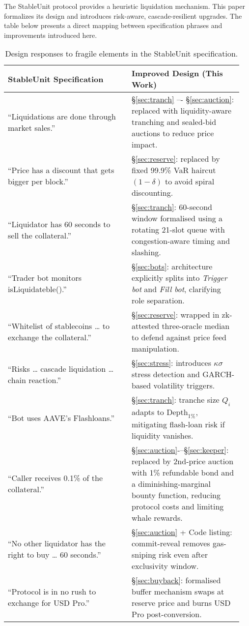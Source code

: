 \documentclass[11pt]{article}
\newcommand{\secref}[1]{\hyperref[#1]{\S\ref*{#1}}}
\begin{document}
The StableUnit protocol \parencite{stableunit2025spec} provides a heuristic liquidation mechanism. This paper formalizes its design and introduces risk-aware, cascade-resilient upgrades. The table below presents a direct mapping between specification phrases and improvements introduced here.
\begin{table}[ht]
\centering
\caption{Design responses to fragile elements in the StableUnit specification.}
\label{tab:trigger-map}

\begin{tabular}{@{}p{0.5\linewidth} p{0.45\linewidth}@{}}
\toprule
\textbf{StableUnit Specification} & \textbf{Improved Design (This Work)} \\
\midrule
“Liquidations are done through market sales.” & \secref{sec:tranch} –- \secref{sec:auction}: replaced with liquidity-aware tranching and sealed-bid auctions to reduce price impact. \\
“Price has a discount that gets bigger per block.” & \secref{sec:reserve}: replaced by fixed 99.9\% VaR haircut $(1 - \delta)$ to avoid spiral discounting. \\
“Liquidator has 60 seconds to sell the collateral.” & \secref{sec:tranch}: 60-second window formalised using a rotating 21-slot queue with congestion-aware timing and slashing. \\
“Trader bot monitors isLiquidateble().” & \secref{sec:bots}: architecture explicitly splits into \textit{Trigger bot} and \textit{Fill bot}, clarifying role separation. \\
“Whitelist of stablecoins … to exchange the collateral.” & \secref{sec:reserve}: wrapped in zk-attested three-oracle median to defend against price feed manipulation. \\
“Risks … cascade liquidation … chain reaction.” & \secref{sec:stress}: introduces $\kappa\sigma$ stress detection and GARCH-based volatility triggers. \\
“Bot uses AAVE’s Flashloans.” & \secref{sec:tranch}: tranche size $Q_i$ adapts to $\text{Depth}_{1\%}$, mitigating flash-loan risk if liquidity vanishes. \\
“Caller receives 0.1\% of the collateral.” & \secref{sec:auction}-–\secref{sec:keeper}: replaced by 2nd-price auction with 1\% refundable bond and a diminishing-marginal bounty function, reducing protocol costs and limiting whale rewards. \\
“No other liquidator has the right to buy … 60 seconds.” & \secref{sec:auction} + Code listing: commit-reveal removes gas-sniping risk even after exclusivity window. \\
“Protocol is in no rush to exchange for USD Pro.” &  \secref{sec:buyback}: formalised buffer mechanism swaps at reserve price and burns USD Pro post-conversion. \\
\bottomrule
\end{tabular}
\end{table}
\end{document}
